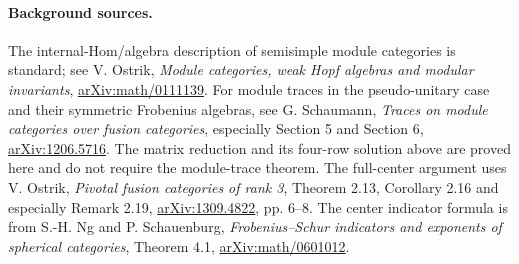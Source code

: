 \paragraph{Background sources.}
The internal-Hom/algebra description of semisimple module categories is
standard; see V. Ostrik, \emph{Module categories, weak Hopf algebras and
modular invariants}, \href{https://arxiv.org/abs/math/0111139}{arXiv:math/0111139}.
For module traces in the pseudo-unitary case and their symmetric
Frobenius algebras, see G. Schaumann, \emph{Traces on module categories
over fusion categories}, especially Section 5 and Section 6,
\href{https://arxiv.org/abs/1206.5716}{arXiv:1206.5716}.
The matrix reduction and its four-row solution above are proved here
and do not require the module-trace theorem.
The full-center argument uses V. Ostrik, \emph{Pivotal fusion categories
of rank 3}, Theorem 2.13, Corollary 2.16 and especially Remark 2.19,
\href{https://arxiv.org/abs/1309.4822}{arXiv:1309.4822}, pp. 6--8.
The center indicator formula is from S.-H. Ng and P. Schauenburg,
\emph{Frobenius--Schur indicators and exponents of spherical categories},
Theorem 4.1, \href{https://arxiv.org/abs/math/0601012}{arXiv:math/0601012}.




